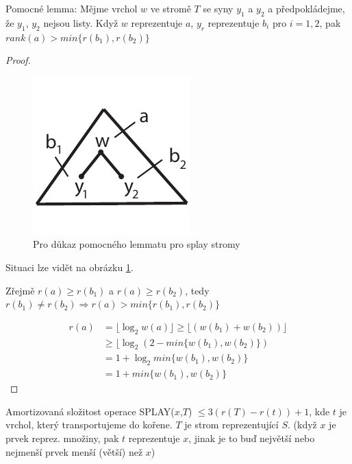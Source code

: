 \begin{lemma}
\label{splay-pomlemma}
Pomocné lemma: Mějme vrchol $w$ ve stromě $T$ se syny $y_1$ a $y_2$ a
předpokládejme, že $y_1$, $y_2$ nejsou listy. Když $w$ reprezentuje $a$,
$y_r$ reprezentuje $b_i$ pro $i=1,2$, pak $rank(a) > min\{r(b_1),r(b_2)\}$
\end{lemma}

\begin{proof}
\begin{figure}[!htb]
\centering\includegraphics{pics/splay-lemma}
\caption{Pro důkaz pomocného lemmatu pro splay stromy}
\label{splay-lemma}
\end{figure}

Situaci lze vidět na obrázku \ref{splay-lemma}. 
\par
Zřejmě $r(a) \geq r(b_1)$ a $r(a) \geq r(b_2)$, tedy $r(b_1) \neq r(b_2) 
\Rightarrow r(a) > min\{r(b_1),r(b_2)\}$
\par
\begin{equation}
\begin{split}
r(a) 
& = \lfloor \log_2 w(a) \rfloor \geq \lfloor (w(b_1) + w(b_2)) \rfloor \\
& \geq \lfloor \log_2(2 - min\{w(b_1),w(b_2)\}) \\
& = 1 + \log_2 min\{w(b_1),w(b_2)\} \\
& = 1 + min\{w(b_1),w(b_2)\}
\end{split}
\end{equation}
\end{proof}

\begin{theorem}
Amortizovaná složitost operace SPLAY($x$,$T$) $\leq 3(r(T)-r(t)) + 1$, 
kde $t$ je vrchol, který transportujeme do kořene. $T$ je strom
reprezentující $S$.
(když $x$ je prvek reprez. množiny, pak $t$ reprezentuje $x$, jinak je to buď
největší nebo nejmenší prvek menší (větší) než $x$)
\end{theorem}

